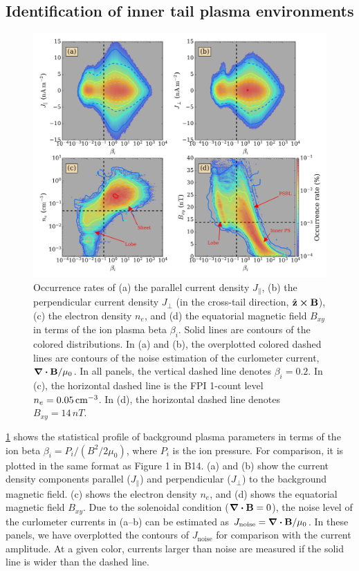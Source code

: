 \documentclass[draft]{agujournal2019}
\begin{document}
\subsection{Identification of inner tail plasma
environments}\label{sec:tail_environments}

\begin{figure}
\centering
\noindent\includegraphics[width=\textwidth]{2023JA031358R-f03.pdf}
\caption{
    Occurrence rates of (a) the parallel current density $J_\|$, (b) the perpendicular current density $J_\perp$ (in the cross-tail direction, ${\hat{\vb{z}}\cross\vb{B}}$), (c) the electron density $n_e$, and (d) the equatorial magnetic field $B_{xy}$ in terms of the ion plasma beta $\beta_i$. Solid lines are contours of the colored distributions. In (a) and (b), the overplotted colored dashed lines are contours of the noise estimation of the curlometer current, ${\div{\vb{B}}/\mu_0}$. In all panels, the vertical dashed line denotes ${\beta_i=0.2}$. In (c), the horizontal dashed line is the FPI 1-count level ${n_e=0.05\,\si{cm\tothe{-3}}}$. In (d), the horizontal dashed line denotes ${B_{xy}=14\,\si{nT}}$.
}
\label{fig:compare_B14}
\end{figure}

\cref{fig:compare_B14} shows the statistical profile of background plasma parameters in terms of the ion beta ${\beta_i=P_i/(B^2/2\mu_0)}$, where $P_i$ is the ion pressure. For comparison, it is plotted in the same format as Figure 1 in B14. (a) and (b) show the current density components parallel ($J_\|$) and perpendicular ($J_\perp$) to the background magnetic field. (c) shows the electron density $n_e$, and (d) shows the equatorial magnetic field $B_{xy}$. Due to the solenoidal condition (\mbox{${\div{\vb{B}}=0}$}), the noise level of the curlometer currents in (a--b) can be estimated as \mbox{${J_\text{noise}=\div{\vb{B}}/\mu_0}$}. In these panels, we have overplotted the contours of \mbox{$J_\text{noise}$} for comparison with the current amplitude. At a given color, currents larger than noise are measured if the solid line is wider than the dashed line.
\end{document}
